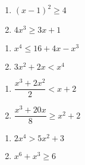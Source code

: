 \begin{multicols}{2}
\begin{enumerate}
\setcounter{enumi}{\value{HW}}

\item $(x - 1)^{2} \geq 4$
\item $4x^3 \geq 3x+1$

\setcounter{HW}{\value{enumi}}
\end{enumerate}
\end{multicols}

\begin{multicols}{2}
\begin{enumerate}
\setcounter{enumi}{\value{HW}}

\item $x^4 \leq 16+4x-x^3$
\item $3x^2 + 2x < x^4$

\setcounter{HW}{\value{enumi}}
\end{enumerate}
\end{multicols}

\begin{multicols}{2}
\begin{enumerate}
\setcounter{enumi}{\value{HW}}

\item $\dfrac{x^3+2 x^2}{2} < x+2$
\item $\dfrac{x^3+20x}{8} \geq x^2 + 2$

\setcounter{HW}{\value{enumi}}
\end{enumerate}
\end{multicols}

\begin{multicols}{2}
\begin{enumerate}
\setcounter{enumi}{\value{HW}}

\item $2x^4>5x^2+3$
\item $x^6 + x^3 \geq 6$ \label{polyinequexerlast}

\setcounter{HW}{\value{enumi}}
\end{enumerate}
\end{multicols}

